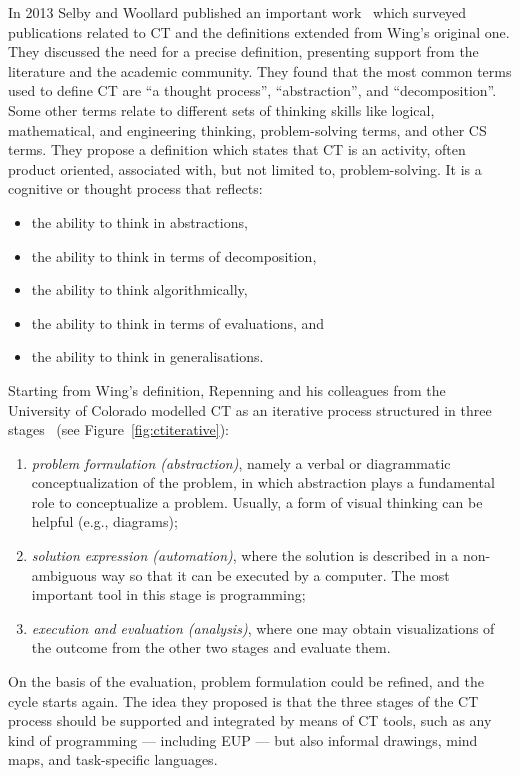 In 2013 Selby and Woollard published an important work~\cite{eps346937} which surveyed publications related to \ac{CT} and the definitions extended from Wing's original one. They discussed the need for a precise definition, presenting support from the literature and the academic community. They found that the most common terms used to define \ac{CT} are ``a thought process'', ``abstraction'', and ``decomposition''. Some other terms relate to different sets of thinking skills like logical, mathematical, and engineering thinking, problem-solving terms, and other \ac{CS} terms. They propose a definition which states that \ac{CT} is an activity, often product oriented, associated with, but not limited to, problem-solving. It is a cognitive or thought process that reflects:
\begin{itemize}
  \item the ability to think in abstractions,
  \item the ability to think in terms of decomposition,
  \item the ability to think algorithmically,
  \item the ability to think in terms of evaluations, and
  \item the ability to think in generalisations.
\end{itemize}

Starting from Wing's definition, Repenning and his colleagues from the University of Colorado modelled \ac{CT} as an iterative process structured in three stages~\cite{Repenning:fy} (see Figure~\ref{fig:ctiterative}):
\begin{enumerate}
  \item \textit{problem formulation (abstraction)}, namely a verbal or diagrammatic conceptualization of the problem, in which abstraction plays a fundamental role to conceptualize a problem. Usually, a form of visual thinking can be helpful (e.g., diagrams);
  \item \textit{solution expression (automation)}, where the solution is described in a non-ambiguous way so that it can be executed by a computer. The most important tool in this stage is programming;
  \item \textit{execution and evaluation (analysis)}, where one may obtain visualizations of the outcome from the other two stages and evaluate them.
\end{enumerate}

On the basis of the evaluation, problem formulation could be refined, and the cycle starts again. The idea they proposed is that the three stages of the \ac{CT} process should be supported and integrated by means of \ac{CT} tools, such as any kind of programming --- including \ac{EUP} --- but also informal drawings, mind maps, and task-specific languages.

